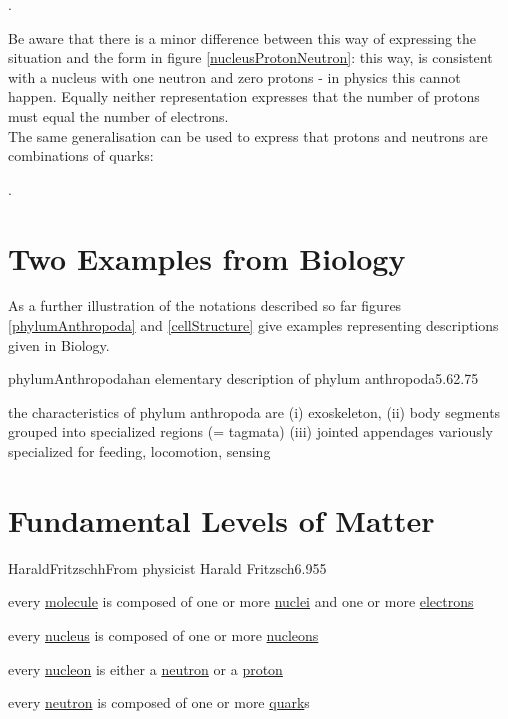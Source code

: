 \begin{center}

.
\end{center}
Be aware that there is a minor difference between this way of expressing the situation and the form in figure \ref{nucleusProtonNeutron}: this way, 
is consistent with a nucleus with one neutron and zero protons - in physics this cannot happen.
Equally neither representation expresses that the number of protons must equal the number of electrons. \\

\noindent The same generalisation can be used to express that protons and neutrons are combinations of quarks:
\begin{center}

.
\end{center}

\needspace{6cm}
\section{Two Examples from Biology}
As a further illustration of the notations described so far figures \ref{phylumAnthropoda} and \ref{cellStructure} give examples representing descriptions given in Biology. 
\begin{ernotedDimFig}{phylumAnthropoda}{h}{an elementary description of phylum anthropoda}{5.6}{2.75}
\item{the characteristics of phylum anthropoda are (i) exoskeleton, (ii) body segments grouped into specialized regions (= tagmata)
(iii) jointed appendages variously specialized for feeding, locomotion, sensing }
\end{ernotedDimFig}


\needspace{10cm}
\section{Fundamental Levels of Matter}
\noindent

\begin{erbulletedDimFig}{HaraldFritzsch}{h}{From physicist Harald Fritzsch}{6.95}{5}
\item{every \underline{molecule} is composed of one or more \underline{nuclei} and one or more \underline{electrons}}
\vspace{0.5cm}
\item{every \underline{nucleus} is composed of one or more \underline{nucleons}}
\vspace{0.5cm}
\item{every \underline{nucleon} is either a \underline{neutron} or a \underline{proton}}
\vspace{0.5cm}
\item{every \underline{neutron} is composed of one or more \underline{quark}s}
\end{erbulletedDimFig}

